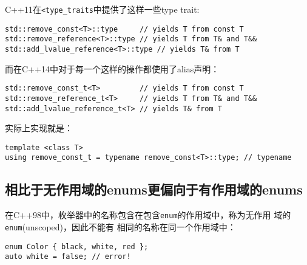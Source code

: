 C++11在\texttt{<type\_traits}中提供了这样一些type trait:
\begin{verbatim}
std::remove_const<T>::type     // yields T from const T
std::remove_reference<T>::type // yields T from T& and T&&
std::add_lvalue_reference<T>::type // yields T& from T
\end{verbatim}
而在C++14中对于每一个这样的操作都使用了alias声明：
\begin{verbatim}
std::remove_const_t<T>         // yields T from const T
std::remove_reference_t<T>     // yields T from T& and T&& 
std::add_lvalue_reference_t<T> // yields T& from T
\end{verbatim}
实际上实现就是：
\begin{verbatim}
template <class T>
using remove_const_t = typename remove_const<T>::type; // typename
\end{verbatim}

\subsection{相比于无作用域的enums更偏向于有作用域的enums}
\label{sec:Item2-10}

在C++98中，枚举器中的名称包含在包含\texttt{enum}的作用域中，称为无作用
域的\texttt{enum}(unscoped)，因此不能有
相同的名称在同一个作用域中：
\begin{verbatim}
enum Color { black, white, red }; 
auto white = false; // error!
\end{verbatim}

